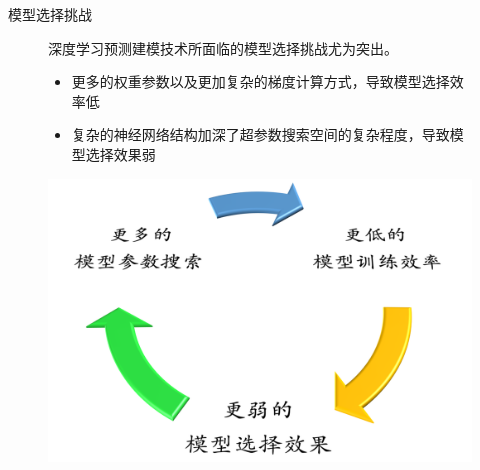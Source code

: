 \begin{frame}{模型选择挑战}
    \begin{figure}
        \begin{minipage}[b]{0.45\textwidth}
            深度学习预测建模技术所面临的模型选择挑战尤为突出。
            \vspace{2em}
            \begin{itemize}
                \item 更多的权重参数以及更加复杂的梯度计算方式，导致模型选择效率低
                \item 复杂的神经网络结构加深了超参数搜索空间的复杂程度，导致模型选择效果弱
            \end{itemize}
        \end{minipage}
        \quad
    \begin{minipage}[b]{0.45\textwidth}
        \includegraphics[width=\textwidth]{float/ch.intro/circle.png}
    \end{minipage}
    \end{figure}
    \end{frame}

